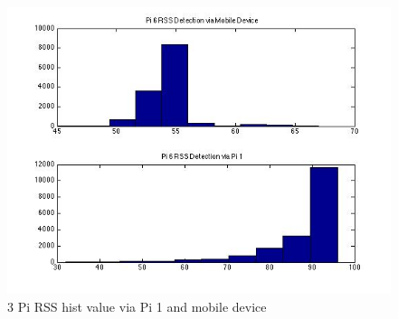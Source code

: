 \documentclass[10pt,conference]{IEEEtran}
\begin{document}
\begin{figure}[htbp]
\begin{minipage}[t]{0.2\textwidth}
	\includegraphics[scale=0.2]{device0-3}
\end{minipage}
\caption{3 Pi RSS hist value via Pi 1 and mobile device}\label{hist7}
\end{figure}
\end{document}
